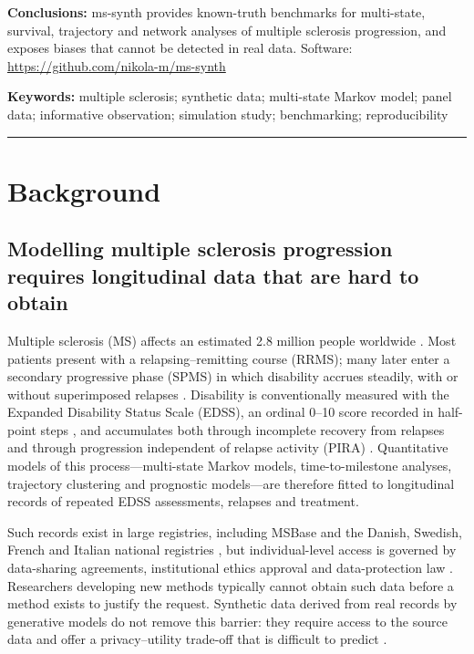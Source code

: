 \documentclass[11pt,a4paper]{article}
\begin{document}
\noindent\textbf{Conclusions:}
ms-synth provides known-truth benchmarks for multi-state, survival, trajectory and network analyses of multiple sclerosis progression, and exposes biases that cannot be detected in real data. Software: \url{https://github.com/nikola-m/ms-synth}

\vspace{6pt}
\noindent\textbf{Keywords:} multiple sclerosis; synthetic data; multi-state Markov model; panel data; informative observation; simulation study; benchmarking; reproducibility

\vspace{6pt}\hrule

\section*{Background}

\subsection*{Modelling multiple sclerosis progression requires longitudinal data that are hard to obtain}

Multiple sclerosis (MS) affects an estimated 2.8 million people worldwide \cite{walton2020}. Most patients present with a relapsing--remitting course (RRMS); many later enter a secondary progressive phase (SPMS) in which disability accrues steadily, with or without superimposed relapses \cite{lublin2014}. Disability is conventionally measured with the Expanded Disability Status Scale (EDSS), an ordinal 0--10 score recorded in half-point steps \cite{kurtzke1983}, and accumulates both through incomplete recovery from relapses and through progression independent of relapse activity (PIRA) \cite{kappos2020pira,lublin2022}. Quantitative models of this process---multi-state Markov models, time-to-milestone analyses, trajectory clustering and prognostic models---are therefore fitted to longitudinal records of repeated EDSS assessments, relapses and treatment.

Such records exist in large registries, including MSBase \cite{butzkueven2006} and the Danish, Swedish, French and Italian national registries \cite{magyari2021,hillert2015,vukusic2020,trojano2019}, but individual-level access is governed by data-sharing agreements, institutional ethics approval and data-protection law \cite{gdpr2016}. Researchers developing new methods typically cannot obtain such data before a method exists to justify the request. Synthetic data derived from real records by generative models do not remove this barrier: they require access to the source data and offer a privacy--utility trade-off that is difficult to predict \cite{stadler2022,nowok2016}.
\end{document}
